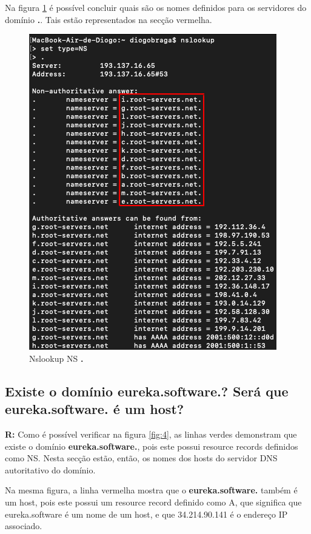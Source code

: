 \documentclass{llncs}
\begin{document}
Na figura \ref{fig:33} é possível concluir quais são os nomes definidos para os servidores do domínio \textbf{.}. Tais estão representados na secção vermelha.

\begin{figure}[H]
\begin{center}
\includegraphics[scale=0.6]{3_3.png}
\end{center}
\caption{\label{fig:33}Nslookup NS \textbf{.}}
\end{figure}


\subsection{\textbf{Existe o domínio eureka.software.? Será que eureka.software. é um host?}}
\textbf{R:} Como é possível verificar na figura \ref{fig:4}, as linhas verdes demonstram que existe o domínio \textbf{eureka.software.}, pois este possui resource records definidos como NS. Nesta secção estão, então, os nomes dos hosts do servidor DNS autoritativo do domínio.

Na mesma figura, a linha vermelha mostra que o \textbf{eureka.software.} também é um host, pois este possui um resource record definido como A, que significa que eureka.software é um nome de um host, e que 34.214.90.141 é o endereço IP associado.
\end{document}
